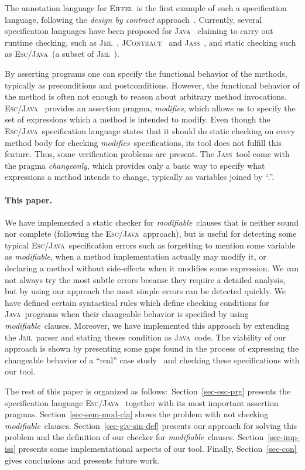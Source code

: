 \documentclass[a4paper]{llncs}
\newcommand{\jml}{\textsc{Jml}}
\newcommand{\escj}{\textsc{Esc/Java}}
\newcommand{\jass}{\textsc{Jass}}
\newcommand{\jcontract}{\textsc{JContract}}
\newcommand{\java}{\textsc{Java}}
\newcommand{\eiff}{\textsc{Eiffel}}
\newcommand{\modif}{\textit{modifiable}}
\newcommand{\modifies}{\textit{modifies}}
\begin{document}
The annotation language for \eiff~is the first example of such a
specification language, following the \emph{design by contract}
approach~\cite{Mey97}. Currently, several specification languages have
been proposed for \java~ claiming to carry out runtime
checking, such as \jml~\cite{LBR00}, \jcontract~\cite{JContractUrl} and
\jass~\cite{JassUrl}, and static checking such as
\escj~\cite{LeinoNS00}(a subset of \jml~\cite{EscJmlDiff}). 

By
asserting programs one can specify the functional
behavior of the methods, typically as preconditions and
postconditions. However, the functional behavior of the method is
often not enough to reason about arbitrary method
invocations. \escj~
provides an assertion pragma, \modifies, which allows us to
specify the set of expressions which a method is intended to
modify. Even though the \escj~specification language states that it
should
do static checking on every method body for checking
\modifies~specifications, its tool does not fulfill
this feature. Thus, some verification problems are
present. The \jass~tool come with the pragma \textit{changeonly},
which provides only a basic way to specify what expressions a method
intends to change, typically as variables joined by ``.''.

\paragraph{\bf This paper.}We
have implemented a static checker for \modif~clauses that is neither
sound nor complete (following the \escj~approach), but is useful
for detecting some typical \escj~specification errors such as
forgetting to mention some variable
as \modif, when a method implementation actually may modify it, or
declaring a method without side-effects when it modifies some
expression. We can not always try the most subtle errors because they 
require a detailed analysis, but by using our approach the most
simple errors can be detected quickly. We have defined certain
syntactical rules which define checking conditions for \java~programs
when their changeable behavior is specified by using
\modif~clauses. Moreover, we have implemented
this approach by extending the \jml~parser and stating theses
condition as \java~code. The viability of our approach is
shown by presenting some gaps found in the process of expressing the
changeable behavior of a ``real'' case study~\cite{CH02} and checking
these specifications with our tool.


The rest of this paper is organized as follows$:$
Section~\ref{sec-esc-prg} presents the specification language \escj~
together with its most important assertion
pragmas. Section~\ref{sec-sem-mod-cla} shows the problem
with not checking \modif~clauses. Section~\ref{sec-giv-sin-def}
presents our approach for solving this problem and the definition of
our checker for \modif~clauses. Section~\ref{sec-imp-iss} presents
some implementational aspects of our tool. Finally, Section~\ref{sec-con}
gives conclusions and presents future work.
\end{document}
